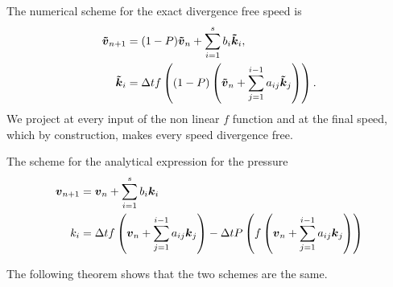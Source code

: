 The numerical scheme for the exact divergence free speed is
\begin{subequations}
\begin{align}
{\boldsymbol {\tilde{v}}}_{n+1}&=(1-P){\boldsymbol {\tilde{v}}}_{n}+\sum_{i=1}^{s}b_{i}{\boldsymbol {\tilde{k}}}_{i},\\
{\boldsymbol {\tilde{k}}}_{i}&=\Delta t f\left((1-P)\left({\boldsymbol {\tilde{v}}}_{n}+\sum_{j=1}^{i-1}a_{ij}{\boldsymbol {\tilde{k}}}_{j}\right)\right).
\end{align}
\end{subequations}
We project at every input of the non linear $f$ function and at the final speed, which by construction, makes every speed divergence free.

The scheme for the analytical expression for the pressure
\begin{subequations}
\begin{align}
	{\boldsymbol {v}}_{n+1}&={\boldsymbol {v}}_{n}+\sum_{i=1}^{s}b_{i}{\boldsymbol {k}}_{i}\\
	k_{i}&=\Delta t f\left({\boldsymbol {v}}_{n}+\sum_{j=1}^{i-1}a_{ij}{\boldsymbol {k}}_{j}\right)-\Delta t P\left(f\left({\boldsymbol {v}}_{n}+\sum_{j=1}^{i-1}a_{ij}{\boldsymbol {k}}_{j}\right)\right)
\end{align}
\end{subequations}

The following theorem shows that the two schemes are the same.

